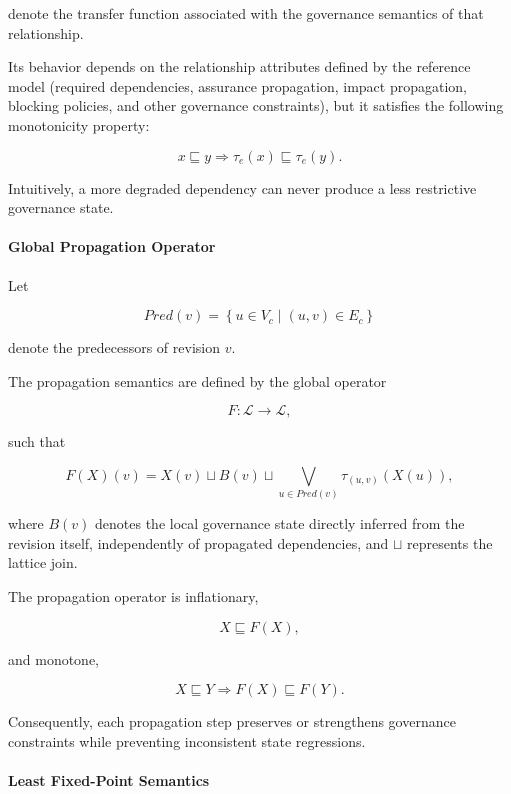 \documentclass[10pt]{article}
\begin{document}
denote the transfer function associated with the governance semantics of that
relationship.

Its behavior depends on the relationship attributes defined by the reference
model (required dependencies, assurance propagation, impact propagation,
blocking policies, and other governance constraints), but it satisfies the
following monotonicity property:

\[
x
\sqsubseteq
y
\Longrightarrow
\tau_e(x)
\sqsubseteq
\tau_e(y).
\]

Intuitively, a more degraded dependency can never produce a less restrictive
governance state.


\paragraph{Global Propagation Operator}

Let

\[
Pred(v)
=
\left\{
u\in V_c
\mid
(u,v)\in E_c
\right\}
\]

denote the predecessors of revision $v$.

The propagation semantics are defined by the global operator

\[
F:
\mathcal{L}
\rightarrow
\mathcal{L},
\]

such that

\[
F(X)(v)
=
X(v)
\sqcup
B(v)
\sqcup
\bigvee_{u\in Pred(v)}
\tau_{(u,v)}
\!\left(
X(u)
\right),
\]

where $B(v)$ denotes the local governance state directly inferred from the
revision itself, independently of propagated dependencies, and $\sqcup$
represents the lattice join.

The propagation operator is inflationary,

\[
X
\sqsubseteq
F(X),
\]

and monotone,

\[
X
\sqsubseteq
Y
\Longrightarrow
F(X)
\sqsubseteq
F(Y).
\]

Consequently, each propagation step preserves or strengthens governance
constraints while preventing inconsistent state regressions.


\paragraph{Least Fixed-Point Semantics}
\end{document}
